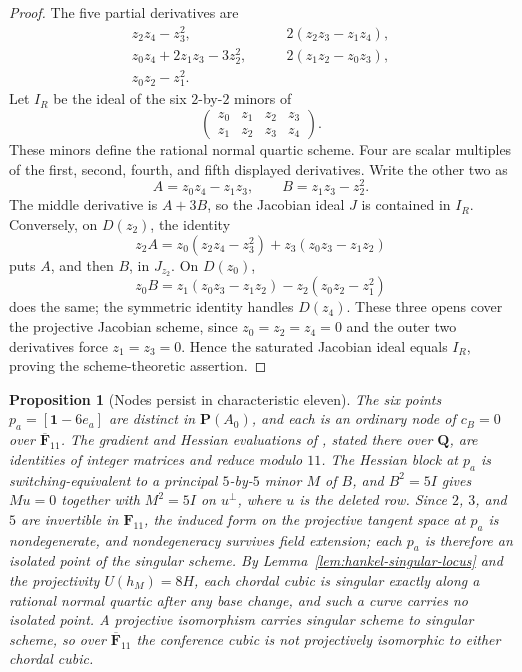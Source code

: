 \documentclass[11pt]{article}
\newtheorem{proposition}[theorem]{Proposition}
\theoremstyle{definition}
\theoremstyle{remark}
\newcommand{\F}{\mathbf F}
\newcommand{\PP}{\mathbf P}
\begin{document}
\begin{proof}
The five partial derivatives are
\[
\begin{split}
 z_2z_4-z_3^2,&\qquad 2(z_2z_3-z_1z_4),\\
 z_0z_4+2z_1z_3-3z_2^2,&\qquad 2(z_1z_2-z_0z_3),\\
 z_0z_2-z_1^2.&
\end{split}
\]
Let \(I_R\) be the ideal of the six \(2\)-by-\(2\) minors of
\[
 \begin{pmatrix}z_0&z_1&z_2&z_3\\z_1&z_2&z_3&z_4\end{pmatrix}.
\]
These minors define the rational normal quartic scheme.  Four are scalar
multiples of the first, second, fourth, and fifth displayed derivatives.
Write the other two as
\[
 A=z_0z_4-z_1z_3,\qquad B=z_1z_3-z_2^2.
\]
The middle derivative is \(A+3B\), so the Jacobian ideal \(J\) is contained
in \(I_R\).  Conversely, on \(D(z_2)\), the identity
\[
 z_2A=z_0(z_2z_4-z_3^2)+z_3(z_0z_3-z_1z_2)
\]
puts \(A\), and then \(B\), in \(J_{z_2}\).  On \(D(z_0)\),
\[
 z_0B=z_1(z_0z_3-z_1z_2)-z_2(z_0z_2-z_1^2)
\]
does the same; the symmetric identity handles \(D(z_4)\).  These three
opens cover the projective Jacobian scheme, since \(z_0=z_2=z_4=0\) and the
outer two derivatives force \(z_1=z_3=0\).  Hence the saturated Jacobian
ideal equals \(I_R\), proving the scheme-theoretic assertion.
\end{proof}

\begin{proposition}[Nodes persist in characteristic eleven]
\label{prop:nodes-mod-eleven}
The six points \(p_a=[\mathbf 1-6e_a]\) are distinct in \(\PP(A_0)\), and each
is an ordinary node of \(c_B=0\) over \(\overline{\F}_{11}\).  The gradient and
Hessian evaluations of \cite{RuddRigidity2026}, stated there over
\(\mathbf Q\), are identities of integer matrices and reduce modulo \(11\).
The Hessian block at \(p_a\) is switching-equivalent to a principal
\(5\)-by-\(5\) minor \(M\) of \(B\), and \(B^2=5I\) gives \(Mu=0\) together
with \(M^2=5I\) on \(u^\perp\), where \(u\) is the deleted row.  Since \(2\),
\(3\), and \(5\) are invertible in \(\F_{11}\), the induced form on the
projective tangent space at \(p_a\) is nondegenerate, and nondegeneracy
survives field extension; each \(p_a\) is therefore an isolated point of the
singular scheme.  By Lemma~\ref{lem:hankel-singular-locus} and the
projectivity \(U(h_M)=8H\), each chordal cubic is singular exactly along a
rational normal quartic after any base change, and such a curve carries no
isolated point.  A projective isomorphism carries singular scheme to singular
scheme, so over \(\overline{\F}_{11}\) the conference cubic is not
projectively isomorphic to either chordal cubic.
\end{proposition}
\end{document}
